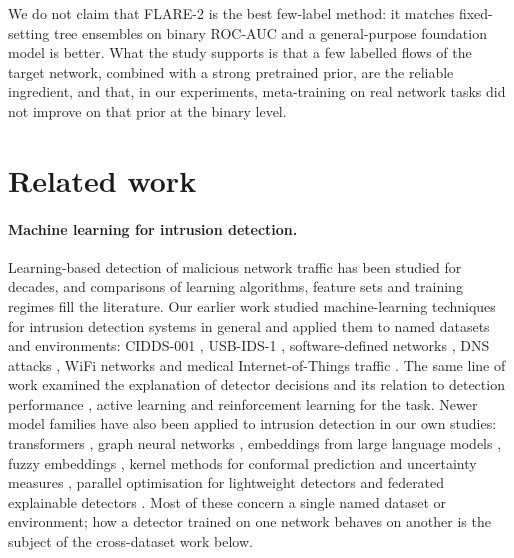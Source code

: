 \documentclass[pdflatex,sn-mathphys-num]{sn-jnl}%
\begin{document}
We do not claim that FLARE-2 is the best few-label method: it matches fixed-setting tree ensembles on binary ROC-AUC and a general-purpose foundation model is better.
What the study supports is that a few labelled flows of the target network, combined with a strong pretrained prior, are the reliable ingredient, and that, in our experiments, meta-training on real network tasks did not improve on that prior at the binary level.

\section{Related work}
\paragraph{Machine learning for intrusion detection.}
Learning-based detection of malicious network traffic has been studied for decades, and comparisons of learning algorithms, feature sets and training regimes fill the literature.
Our earlier work studied machine-learning techniques for intrusion detection systems in general \citep{dang2019studying,dang2022cai,dang2022mlids} and applied them to named datasets and environments: CIDDS-001 \citep{dang2021cidds,dang2022cidds}, USB-IDS-1 \citep{dang2023usbmulti}, software-defined networks \citep{dang2021sdn,dang2024fuzzy}, DNS attacks \citep{dang2022dns,dang2021fuzzydns}, WiFi networks \citep{dang2023wifi} and medical Internet-of-Things traffic \citep{dang2024iomt}.
The same line of work examined the explanation of detector decisions and its relation to detection performance \citep{dang2020understand,dang2021explain}, active learning \citep{dang2020active} and reinforcement learning \citep{dang2022rl} for the task.
Newer model families have also been applied to intrusion detection in our own studies: transformers \citep{dang2023transformer}, graph neural networks \citep{dang2023wifi}, embeddings from large language models \citep{dang2025llm}, fuzzy embeddings \citep{dang2024fuzzy}, kernel methods for conformal prediction and uncertainty measures \citep{dang2024conformal,dang2026uncertainty}, parallel optimisation for lightweight detectors \citep{dang2024lightweight} and federated explainable detectors \citep{dang2026stfedxids}.
Most of these concern a single named dataset or environment; how a detector trained on one network behaves on another is the subject of the cross-dataset work below.
\end{document}
